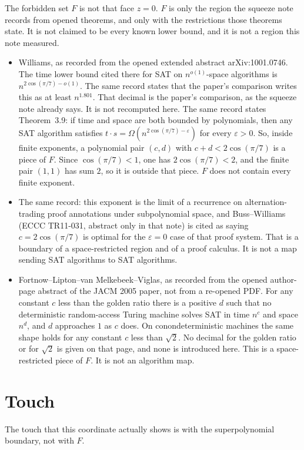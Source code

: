 \documentclass{article}
\begin{document}
The forbidden set \(F\) is not that face \(z=0\).
\(F\) is only the region the squeeze note records from opened theorems, and only with the restrictions those theorems state.
It is not claimed to be every known lower bound, and it is not a region this note measured.

\begin{itemize}
\item Williams, as recorded from the opened extended abstract arXiv:1001.0746.
The time lower bound cited there for SAT on \(n^{o(1)}\)-space algorithms is \(n^{2\cos(\pi/7)-o(1)}\).
The same record states that the paper's comparison writes this as at least \(n^{1.801}\).
That decimal is the paper's comparison, as the squeeze note already says.
It is not recomputed here.
The same record states Theorem~3.9: if time and space are both bounded by polynomials, then any SAT algorithm satisfies \(t\cdot s=\Omega(n^{2\cos(\pi/7)-\varepsilon})\) for every \(\varepsilon>0\).
So, inside finite exponents, a polynomial pair \((c,d)\) with \(c+d<2\cos(\pi/7)\) is a piece of \(F\).
Since \(\cos(\pi/7)<1\), one has \(2\cos(\pi/7)<2\), and the finite pair \((1,1)\) has sum \(2\), so it is outside that piece.
\(F\) does not contain every finite exponent.
\item The same record: this exponent is the limit of a recurrence on alternation-trading proof annotations under subpolynomial space, and Buss--Williams (ECCC TR11-031, abstract only in that note) is cited as saying \(c=2\cos(\pi/7)\) is optimal for the \(\varepsilon=0\) case of that proof system.
That is a boundary of a space-restricted region and of a proof calculus.
It is not a map sending SAT algorithms to SAT algorithms.
\item Fortnow--Lipton--van Melkebeek--Viglas, as recorded from the opened author-page abstract of the JACM 2005 paper, not from a re-opened PDF.
For any constant \(c\) less than the golden ratio there is a positive \(d\) such that no deterministic random-access Turing machine solves SAT in time \(n^c\) and space \(n^d\), and \(d\) approaches \(1\) as \(c\) does.
On conondeterministic machines the same shape holds for any constant \(c\) less than \(\sqrt{2}\).
No decimal for the golden ratio or for \(\sqrt{2}\) is given on that page, and none is introduced here.
This is a space-restricted piece of \(F\).
It is not an algorithm map.
\end{itemize}

\section{Touch}
The touch that this coordinate actually shows is with the superpolynomial boundary, not with \(F\).
\end{document}
